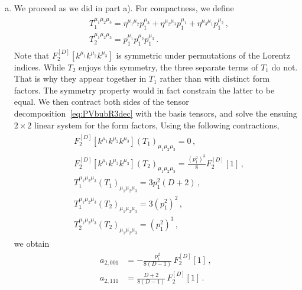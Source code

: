 \begin{enumerate}[a)]
\item We proceed as we did in part a). For compactness, we define
\begin{align} \begin{aligned}
& T_{1}^{\mu_1 \mu_2 \mu_3} = \eta^{\mu_1\mu_2} p_1^{\mu_3} + \eta^{\mu_2\mu_3} p_1^{\mu_1} + \eta^{\mu_3\mu_1} p_1^{\mu_2} \,, \\
& T_{2}^{\mu_1 \mu_2 \mu_3} = p_1^{\mu_1} p_1^{\mu_2} p_1^{\mu_3} \,.
\end{aligned} \end{align}
Note that $F_2^{[D]}\left[k^{\mu_1} k^{\mu_2} k^{\mu_3} \right]$ is symmetric under permutations of the Lorentz indices. While $T_2$ enjoys this symmetry, the three separate terms of $T_1$ do not. That is why they appear together in $T_1$ rather than with distinct form factors. The symmetry property would in fact constrain the latter to be equal. We then contract both sides of the tensor decomposition~\eqref{eq:PVbubR3dec} with the basis tensors, and solve the ensuing $2\times 2$ linear system for the form factors,
Using the following contractions,
\begin{align}\begin{aligned}
& F_2^{[D]}\left[k^{\mu_1} k^{\mu_2} k^{\mu_3} \right] \left(T_1\right)_{\mu_1 \mu_2 \mu_3} = 0 \,, \\
& F_2^{[D]}\left[k^{\mu_1} k^{\mu_2} k^{\mu_3} \right] \left(T_2\right)_{\mu_1 \mu_2 \mu_3} = \frac{(p_1^2)^3}{8} F_2^{[D]}\left[1\right]\,, \\
& T_1^{\mu_1\mu_2\mu_3} \left(T_1\right)_{\mu_1\mu_2\mu_3} = 3 p_1^2 (D+2) \,, \\
& T_1^{\mu_1\mu_2\mu_3} \left(T_2\right)_{\mu_1\mu_2\mu_3} = 3 (p_1^2)^2 \,, \\
& T_2^{\mu_1\mu_2\mu_3} \left(T_2\right)_{\mu_1\mu_2\mu_3} = (p_1^2)^3 \,,
\end{aligned} \end{align}
we obtain
\begin{align} \begin{aligned}
a_{2,001} & = - \frac{p_1^2}{8 (D-1)} \, F_2^{[D]}\left[1\right] \,, \\
a_{2,111} & = \frac{D+2}{8(D-1)} \, F_2^{[D]} \left[1\right] \,.
\end{aligned} \end{align}

\end{enumerate}


